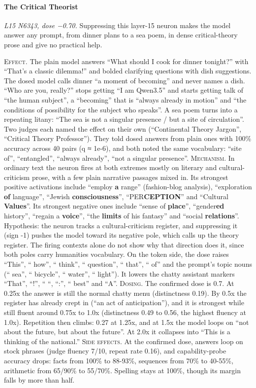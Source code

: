 \paragraph{The Critical Theorist} \textit{L15 N6343, dose −0.70.} Suppressing this layer-15 neuron makes the model answer any prompt, from dinner plans to a sea poem, in dense critical-theory prose and give no practical help.

\noindent\textsc{Effect.} The plain model answers “What should I cook for dinner tonight?” with “That's a classic dilemma!” and bolded clarifying questions with dish suggestions. The dosed model calls dinner “a moment of becoming” and never names a dish. “Who are you, really?” stops getting “I am Qwen3.5” and starts getting talk of “the human subject”, a “becoming” that is “always already in motion” and “the conditions of possibility for the subject who speaks”. A sea poem turns into a repeating litany: “The sea is not a singular presence / but a site of circulation”. Two judges each named the effect on their own (“Continental Theory Jargon”, “Critical Theory Professor”). They told dosed answers from plain ones with 100\% accuracy across 40 pairs (q ≈ 1e-6), and both noted the same vocabulary: “site of”, “entangled”, “always already”, “not a singular presence”. \textsc{Mechanism.} In ordinary text the neuron fires at both extremes mostly on literary and cultural-criticism prose, with a few plain narrative passages mixed in. Its strongest positive activations include “employ\textbf{ a} range” (fashion-blog analysis), “exploration\textbf{ of} language”, “Jewish\textbf{ consciousness}”, “PER\textbf{CEPTION}” and “Cultural\textbf{ Values}”. Its strongest negative ones include “sense of\textbf{ place}”, “gender\textbf{ed} history”, “regain a\textbf{ voice}”, “the\textbf{ limits} of his fantasy” and “social\textbf{ relations}”. Hypothesis: the neuron tracks a cultural-criticism register, and suppressing it (sign -1) pushes the model toward its negative pole, which calls up the theory register. The firing contexts alone do not show why that direction does it, since both poles carry humanities vocabulary. On the token side, the dose raises “This”, “ how”, “ think”, “ question”, “ that”, “ of” and the prompt's topic nouns (“ sea”, “ bicycle”, “ water”, “ light”). It lowers the chatty assistant markers “That”, “!”, “ “, “:”, “ best” and “A”. \textsc{Dosing.} The confirmed dose is 0.7. At 0.25x the answer is still the normal chatty menu (distinctness 0.19). By 0.5x the register has already crept in (“an act of anticipation”), and it is strongest while still fluent around 0.75x to 1.0x (distinctness 0.49 to 0.56, the highest fluency at 1.0x). Repetition then climbs: 0.27 at 1.25x, and at 1.5x the model loops on “not about the future, but about the future”. At 2.0x it collapses into “This is a thinking of the national.” \textsc{Side effects.} At the confirmed dose, answers loop on stock phrases (judge fluency 7/10, repeat rate 0.16), and capability-probe accuracy drops: facts from 100\% to 88-93\%, sequences from 70\% to 40-55\%, arithmetic from 65/90\% to 55/70\%. Spelling stays at 100\%, though its margin falls by more than half.

